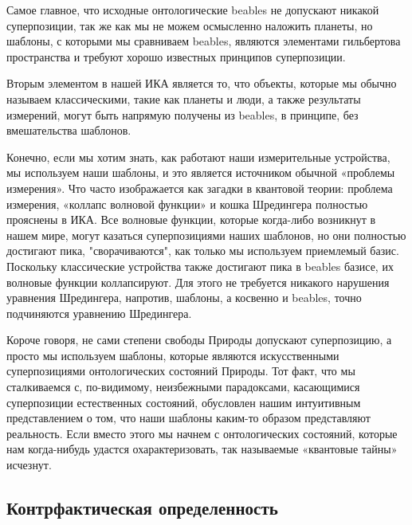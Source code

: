 \documentclass[main.tex]{subfiles}
\begin{document}
Самое главное, что исходные онтологические beables не допускают никакой суперпозиции, так же как мы не можем осмысленно наложить планеты, но шаблоны, с которыми мы сравниваем beables, являются элементами гильбертова пространства и требуют хорошо известных принципов суперпозиции.

Вторым элементом в нашей ИКА является то, что объекты, которые мы обычно называем классическими, такие как планеты и люди, а также результаты измерений, могут быть напрямую получены из beables, в принципе, без вмешательства шаблонов.

Конечно, если мы хотим знать, как работают наши измерительные устройства, мы используем наши шаблоны, и это является источником обычной «проблемы измерения». Что часто изображается как загадки в квантовой теории: проблема измерения, «коллапс волновой функции» и кошка Шредингера полностью прояснены в ИКА. Все волновые функции, которые когда-либо возникнут в нашем мире, могут казаться суперпозициями наших шаблонов, но они полностью достигают пика, "сворачиваются", как только мы используем приемлемый базис. Поскольку классические устройства также достигают пика в beables базисе, их волновые функции коллапсируют. Для этого не требуется никакого нарушения уравнения Шредингера, напротив, шаблоны, а косвенно и beables, точно подчиняются уравнению Шредингера.

Короче говоря, не сами степени свободы Природы допускают суперпозицию, а просто мы используем шаблоны, которые являются искусственными суперпозициями онтологических состояний Природы. Тот факт, что мы сталкиваемся с, по-видимому, неизбежными парадоксами, касающимися суперпозиции естественных состояний, обусловлен нашим интуитивным представлением о том, что наши шаблоны каким-то образом представляют реальность. Если вместо этого мы начнем с онтологических состояний, которые нам когда-нибудь удастся охарактеризовать, так называемые «квантовые тайны» исчезнут.

\subsection{Контрфактическая определенность}\label{ch10.2}
\end{document}
